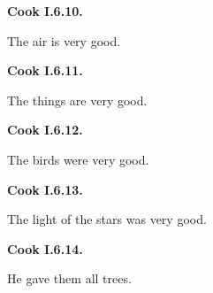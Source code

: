 \par\begin{minipage}{\linewidth}\raggedright
\textbf{Cook I.6.10.}

The air is very good.

\end{minipage}\par\addvspace{4pt}

\par\begin{minipage}{\linewidth}\raggedright
\textbf{Cook I.6.11.}

The things are very good.

\end{minipage}\par\addvspace{4pt}

\par\begin{minipage}{\linewidth}\raggedright
\textbf{Cook I.6.12.}

The birds were very good.

\end{minipage}\par\addvspace{4pt}

\par\begin{minipage}{\linewidth}\raggedright
\textbf{Cook I.6.13.}

The light of the stars was very good.

\end{minipage}\par\addvspace{4pt}

\par\begin{minipage}{\linewidth}\raggedright
\textbf{Cook I.6.14.}

He gave them all trees.

\end{minipage}\par\addvspace{4pt}

